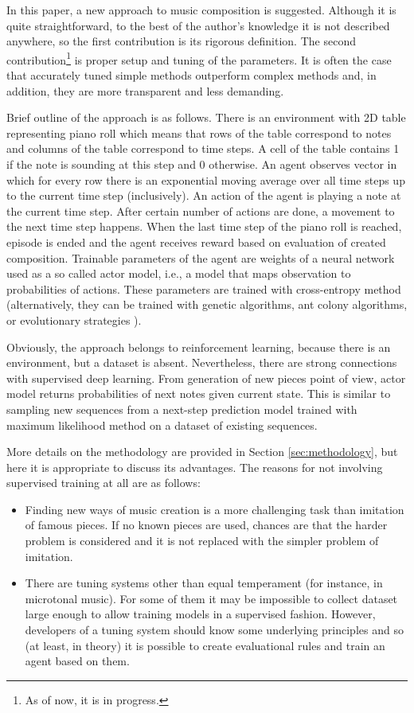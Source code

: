\documentclass{article}
\begin{document}
In this paper, a new approach to music composition is suggested. Although it is quite straightforward, to the best of the author's knowledge it is not described anywhere, so the first contribution is its rigorous definition. The second contribution\footnote{As of now, it is in progress.} is proper setup and tuning of the parameters. It is often the case that accurately tuned simple methods outperform complex methods \cite{dacrema2019are} and, in addition, they are more transparent and less demanding.

Brief outline of the approach is as follows. There is an environment with 2D table representing piano roll which means that rows of the table correspond to notes and columns of the table correspond to time steps. A cell of the table contains 1 if the note is sounding at this step and 0 otherwise. An agent observes vector in which for every row there is an exponential moving average over all time steps up to the current time step (inclusively). An action of the agent is playing a note at the current time step. After certain number of actions are done, a movement to the next time step happens. When the last time step of the piano roll is reached, episode is ended and the agent receives reward based on evaluation of created composition. Trainable parameters of the agent are weights of a neural network used as a so called actor model, i.e., a model that maps observation to probabilities of actions. These parameters are trained with cross-entropy method \cite{rubinstein1997optimization} (alternatively, they can be trained with genetic algorithms, ant colony algorithms, or evolutionary strategies \cite{salimans2017evolution}).

Obviously, the approach belongs to reinforcement learning, because there is an environment, but a dataset is absent. Nevertheless, there are strong connections with supervised deep learning. From generation of new pieces point of view, actor model returns probabilities of next notes given current state. This is similar to sampling new sequences from a next-step prediction model trained with maximum likelihood method on a dataset of existing sequences.

More details on the methodology are provided in Section \ref{sec:methodology}, but here it is appropriate to discuss its advantages. The reasons for not involving supervised training at all are as follows:
\begin{itemize}
	\item Finding new ways of music creation is a more challenging task than imitation of famous pieces. If no known pieces are used, chances are that the harder problem is considered and it is not replaced with the simpler problem of imitation.
	\item There are tuning systems other than equal temperament (for instance, in microtonal music). For some of them it may be impossible to collect dataset large enough to allow training models in a supervised fashion. However, developers of a tuning system should know some underlying principles and so (at least, in theory) it is possible to create evaluational rules and train an agent based on them.
\end{itemize}
\end{document}
